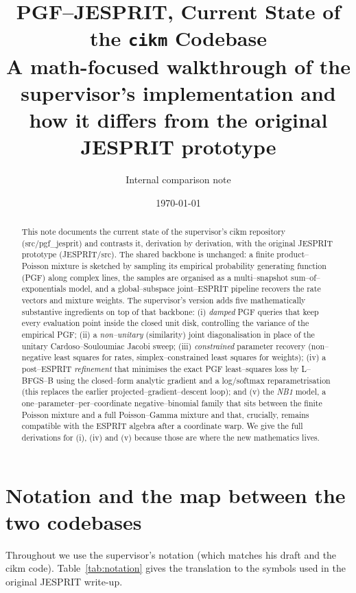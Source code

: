 \documentclass[11pt]{article}
\title{\textbf{PGF--JESPRIT, Current State of the \texttt{cikm} Codebase}\\[2mm]
\large A math-focused walkthrough of the supervisor's implementation and how it differs from the original JESPRIT prototype}
\author{Internal comparison note}
\date{\today}
\newcommand{\code}[1]{\texttt{\small #1}}
\def\code#1{#1}%
\def\small{}%
\theoremstyle{definition}
\begin{document}
\maketitle

\begin{abstract}
This note documents the current state of the supervisor's \code{cikm} repository
(\code{src/pgf\_jesprit}) and contrasts it, derivation by derivation, with the original
JESPRIT prototype (\code{JESPRIT/src}). The shared backbone is unchanged: a finite
product--Poisson mixture is sketched by sampling its empirical probability generating
function (PGF) along complex lines, the samples are organised as a multi--snapshot
sum--of--exponentials model, and a global--subspace joint--ESPRIT pipeline recovers the
rate vectors and mixture weights. The supervisor's version adds five mathematically
substantive ingredients on top of that backbone:
(i) \emph{damped} PGF queries that keep every evaluation point inside the closed unit disk,
controlling the variance of the empirical PGF;
(ii) a \emph{non--unitary} (similarity) joint diagonalisation in place of the unitary
Cardoso--Souloumiac Jacobi sweep;
(iii) \emph{constrained} parameter recovery (non--negative least squares for rates,
simplex--constrained least squares for weights);
(iv) a post--ESPRIT \emph{refinement} that minimises the exact PGF least--squares loss by
L--BFGS--B using the closed--form analytic gradient and a log/softmax reparametrisation
(this replaces the earlier projected--gradient--descent loop); and
(v) the \emph{NB1} model, a one--parameter--per--coordinate negative--binomial family that
sits between the finite Poisson mixture and a full Poisson--Gamma mixture and that, crucially,
remains compatible with the ESPRIT algebra after a coordinate warp.
We give the full derivations for (i), (iv) and (v) because those are where the new
mathematics lives.
\end{abstract}

\tableofcontents

\section{Notation and the map between the two codebases}

Throughout we use the supervisor's notation (which matches his draft and the \code{cikm}
code). Table~\ref{tab:notation} gives the translation to the symbols used in the original
JESPRIT write-up.
\end{document}
